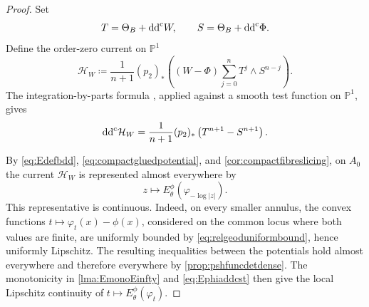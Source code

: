 \begin{proof}
    Set
    \[
        T=\Theta_B+\mathrm{dd}^{\mathrm{c}} W,\qquad S=\Theta_B+\mathrm{dd}^{\mathrm{c}}\Phi.
    \]
    Define the order-zero current on $\mathbb{P}^1$
    \begin{equation}\label{eq:compactrelativeenergycurrent}
        \mathcal{H}_W\coloneqq\frac{1}{n+1}(p_2)_*\left((W-\Phi)\sum_{j=0}^n T^j\wedge S^{n-j}\right).
    \end{equation}
    The integration-by-parts formula \cite{Xia19b}, applied against a smooth test function on $\mathbb{P}^1$, gives
    \begin{equation}\label{eq:compactrelativeenergyddc}
        \mathrm{dd}^{\mathrm{c}}\mathcal{H}_W
        =\frac{1}{n+1}(p_2)_*\left(T^{n+1}-S^{n+1}\right).
    \end{equation}

    By \eqref{eq:Edefbdd}, \eqref{eq:compactgluedpotential}, and \cref{cor:compactfibreslicing}, on $A_0$ the current $\mathcal{H}_W$ is represented almost everywhere by
    \[
        z\longmapsto E_\theta^\phi(\varphi_{-\log|z|}).
    \]
    This representative is continuous. Indeed, on every smaller annulus, the convex functions $t\mapsto\varphi_t(x)-\phi(x)$, considered on the common locus where both values are finite, are uniformly bounded by \eqref{eq:relgeoduniformbound}, hence uniformly Lipschitz. The resulting inequalities between the potentials hold almost everywhere and therefore everywhere by \cref{prop:pshfuncdetdense}. The monotonicity in \cref{lma:EmonoEinfty} and \eqref{eq:Ephiaddcst} then give the local Lipschitz continuity of $t\mapsto E_\theta^\phi(\varphi_t)$.


\end{proof}

